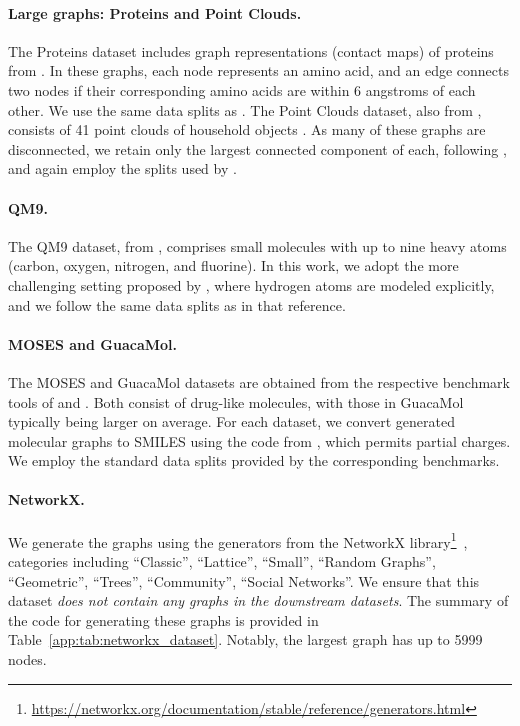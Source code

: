 \paragraph{Large graphs: Proteins and Point Clouds.}
The Proteins dataset includes graph representations (contact maps) of proteins from \citet{dobson2003distinguishing}. In these graphs, each node represents an amino acid, and an edge connects two nodes if their corresponding amino acids are within 6 angstroms of each other. We use the same data splits as \citet{liao2019efficient}. The Point Clouds dataset, also from \citet{liao2019efficient}, consists of 41 point clouds of household objects \citep{neumann2013graph}. As many of these graphs are disconnected, we retain only the largest connected component of each, following \citet{bergmeister2024efficient}, and again employ the splits used by \citet{liao2019efficient}.

\paragraph{QM9.} 
The QM9 dataset, from \citet{wu2018moleculenet}, comprises small molecules with up to nine heavy atoms (carbon, oxygen, nitrogen, and fluorine). In this work, we adopt the more challenging setting proposed by \citet{vignac2023digress}, where hydrogen atoms are modeled explicitly, and we follow the same data splits as in that reference.

\paragraph{MOSES and GuacaMol.} 
The MOSES and GuacaMol datasets are obtained from the respective benchmark tools of \citet{polykovskiy2020moses} and \citet{brown2019guacamol}. Both consist of drug-like molecules, with those in GuacaMol typically being larger on average. For each dataset, we convert generated molecular graphs to SMILES using the code from \citet{jo2022score}, which permits partial charges. We employ the standard data splits provided by the corresponding benchmarks.

\paragraph{NetworkX.}
We generate the graphs using the generators from the NetworkX library\footnote{\url{https://networkx.org/documentation/stable/reference/generators.html}}~\citep{hagberg2008networkx}, categories including ``Classic'', ``Lattice'', ``Small'', ``Random Graphs'', ``Geometric'', ``Trees'', ``Community'', ``Social Networks''. We ensure that this dataset \emph{does not contain any graphs in the downstream datasets}. The summary of the code for generating these graphs is provided in Table~\ref{app:tab:networkx_dataset}. Notably, the largest graph has up to 5999 nodes.


